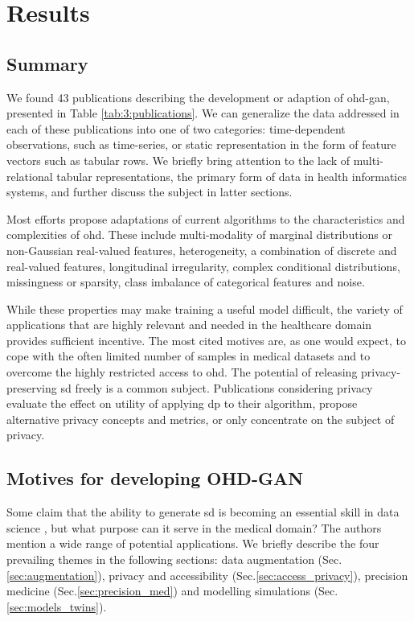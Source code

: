 \section{Results}
    \subsection{Summary}
        We found 43 publications describing the development or adaption of \gls{ohd-gan}, presented in Table \ref{tab:3:publications}. We can generalize the data addressed in each of these publications into one of two categories: time-dependent observations, such as time-series, or static representation in the form of feature vectors such as tabular rows. We briefly bring attention to the lack of multi-relational tabular representations, the primary form of data in health informatics systems, and further discuss the subject in latter sections.\par
        
        Most efforts propose adaptations of current algorithms to the characteristics and complexities of \gls{ohd}. These include multi-modality of marginal distributions or non-Gaussian real-valued features, heterogeneity, a combination of discrete and real-valued features, longitudinal irregularity, complex conditional distributions, missingness or sparsity, class imbalance of categorical features and noise.\par 
        
        While these properties may make training a useful model difficult, the variety of applications that are highly relevant and needed in the healthcare domain provides sufficient incentive. The most cited motives are, as one would expect, to cope with the often limited number of samples in medical datasets and to overcome the highly restricted access to \gls{ohd}. The potential of releasing privacy-preserving \gls{sd} freely is a common subject. Publications considering privacy evaluate the effect on utility of applying \gls{dp} to their algorithm, propose alternative privacy concepts and metrics, or only concentrate on the subject of privacy.\par
        
    \subsection{Motives for developing OHD-GAN}
        Some claim that the ability to generate \gls{sd} is becoming an essential skill in data science \cite{Sarkar2018}, but what purpose can it serve in the medical domain? The authors mention a wide range of potential applications. We briefly describe the four prevailing themes in the following sections: data augmentation (Sec.\ref{sec:augmentation}), privacy and accessibility (Sec.\ref{sec:access_privacy}), precision medicine (Sec.\ref{sec:precision_med}) and  modelling simulations (Sec.\ref{sec:models_twins}). 

